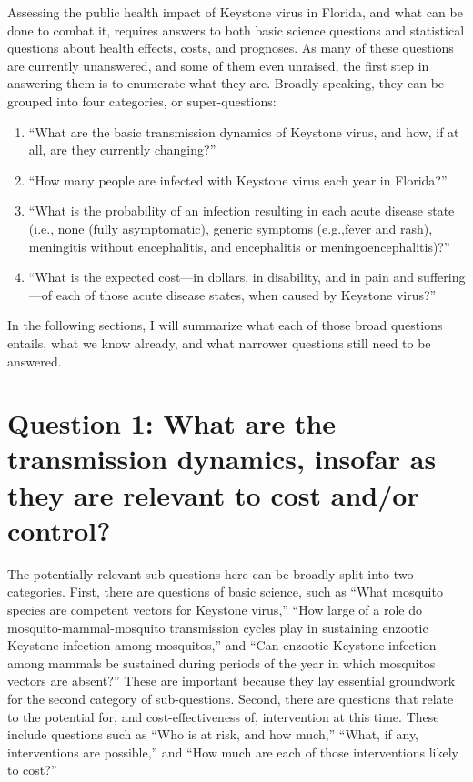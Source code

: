 \documentclass[12pt]{article}
\begin{document}
        Assessing the public health impact of Keystone virus in Florida, and what can be done to combat it, requires answers to both basic science questions and statistical questions about health effects, costs, and prognoses. As many of these questions are currently unanswered, and some of them even unraised, the first step in answering them is to enumerate what they are. Broadly speaking, they can be grouped into four categories, or super-questions:
        \begin{enumerate}
            \item ``What are the basic transmission dynamics of Keystone virus, and how, if at all, are they currently changing?''
            \item ``How many people are infected with Keystone virus each year in Florida?''
            \item ``What is the probability of an infection resulting in each acute disease state (i.e., none (fully asymptomatic), generic symptoms (e.g.,fever and rash), meningitis without encephalitis, and encephalitis or meningoencephalitis)?''
            \item ``What is the expected cost---in dollars, in disability, and in pain and suffering---of each of those acute disease states, when caused by Keystone virus?''
        \end{enumerate}

        In the following sections, I will summarize what each of those broad questions entails, what we know already, and what narrower questions still need to be answered.

    \section[Transmission dynamics]{Question 1: What are the transmission dynamics, insofar as they are relevant to cost and/or control?}
    \label{transmission-dynamics}
        The potentially relevant sub-questions here can be broadly split into two categories. First, there are questions of basic science, such as ``What mosquito species are competent vectors for Keystone virus,'' ``How large of a role do mosquito-mammal-mosquito transmission cycles play in sustaining enzootic Keystone infection among mosquitos,'' and ``Can enzootic Keystone infection among mammals be sustained during periods of the year in which mosquitos vectors are absent?'' These are important because they lay essential groundwork for the second category of sub-questions. Second, there are questions that relate to the potential for, and cost-effectiveness of, intervention at this time. These include questions such as ``Who is at risk, and how much,'' ``What, if any, interventions are possible,'' and ``How much are each of those interventions likely to cost?''
\end{document}
